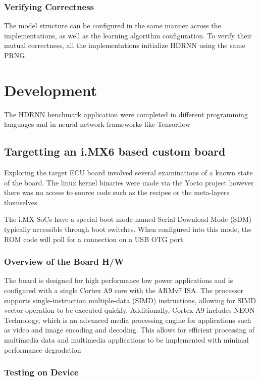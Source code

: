 \subsection[Verifying Correctness]{Verifying Correctness}

The model structure can be configured in the same manner across the implementations, as well as the learning algorithm configuration. To verify their mutual correctness, all the implementations initialize HDRNN using the same PRNG

\chapter{Development}

The HDRNN benchmark application were completed in different programming languages and in neural network frameworks like Tensorflow

\section[iMX6 Custom Board Target]{Targetting an i.MX6 based custom board}

Exploring the target ECU board involved several examinations of a known state of the board. The linux kernel binaries were made via the Yocto project however there was no access to source code such as the recipes or the meta-layers themselves

The i.MX SoCs have a special boot mode named Serial Download Mode (SDM) typically accessible through boot switches. When configured into this mode, the ROM code will poll for a connection on a USB OTG port

\subsection{Overview of the Board H/W}

The board is designed for high performance low power applications and is configured with a single Cortex A9 core with the ARMv7 ISA. The processor supports single-instruction multiple-data (SIMD) instructions, allowing for SIMD vector operation to be executed quickly. Additionally, Cortex A9 includes NEON Technology, which is an advanced media processing engine for applications such as video and image encoding and decoding. This allows for efficient processing of multimedia data and multimedia applications to be implemented with minimal performance degradation

\subsection{Testing on Device}

